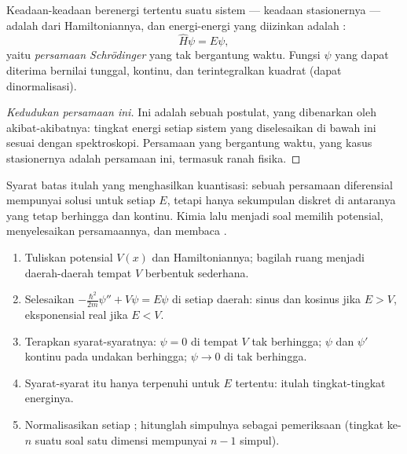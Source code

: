 \begin{theorem}\label{thm:b3:quantum-model-systems:schrodinger}
Keadaan-keadaan berenergi tertentu suatu sistem --- keadaan stasionernya ---
adalah  dari Hamiltoniannya, dan energi-energi yang
diizinkan adalah :
\[
\hat H\psi = E\psi,
\]
yaitu \emph{persamaan Schrödinger} yang tak
bergantung waktu. Fungsi $\psi$ yang dapat diterima bernilai tunggal, kontinu,
dan terintegralkan kuadrat (dapat dinormalisasi).
\end{theorem}
\begin{proof}[Kedudukan persamaan ini]
Ini adalah sebuah postulat, yang dibenarkan oleh akibat-akibatnya: tingkat
energi setiap sistem yang diselesaikan di bawah ini sesuai dengan spektroskopi.
Persamaan yang bergantung waktu, yang kasus stasionernya adalah persamaan ini,
termasuk ranah fisika.
\end{proof}

Syarat batas itulah yang menghasilkan kuantisasi: sebuah persamaan
diferensial mempunyai solusi untuk setiap $E$, tetapi hanya sekumpulan
diskret di antaranya yang tetap berhingga dan kontinu. Kimia lalu menjadi
soal memilih potensial, menyelesaikan persamaannya, dan membaca .

\begin{method}\label{met:b3:quantum-model-systems:one-dimensional}
\begin{enumerate}
  \item Tuliskan potensial $V(x)$ dan Hamiltoniannya; bagilah ruang menjadi
        daerah-daerah tempat $V$ berbentuk sederhana.
  \item Selesaikan $-\frac{\hbar^2}{2m}\psi'' + V\psi = E\psi$ di setiap daerah:
        sinus dan kosinus jika $E > V$, eksponensial real jika $E < V$.
  \item Terapkan syarat-syaratnya: $\psi = 0$ di tempat $V$ tak berhingga;
        $\psi$ dan $\psi'$ kontinu pada undakan berhingga; $\psi \to 0$ di
        tak berhingga.
  \item Syarat-syarat itu hanya terpenuhi untuk $E$ tertentu: itulah
        tingkat-tingkat energinya.
  \item Normalisasikan setiap ; hitunglah simpulnya sebagai
        pemeriksaan (tingkat ke-$n$ suatu soal satu dimensi mempunyai
        $n - 1$ simpul).
\end{enumerate}
\end{method}

